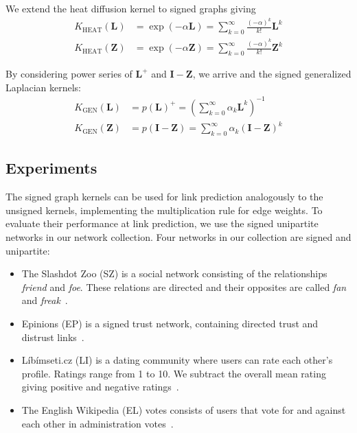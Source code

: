 \documentclass[11pt,a4paper]{book}
\begin{document}
We extend the heat diffusion kernel to signed graphs giving
\begin{align}
  K_{\mathrm{HEAT}}(\mathbf L)  &= \exp(-\alpha \mathbf
  L) 
  = \sum_{k=0}^\infty \frac {(-\alpha)^k} {k!} \mathbf L^k
  \label{eq:signed-heat-diffusion} 
  \\ 
  K_{\mathrm{HEAT}}(\mathbf Z) &= \exp(-\alpha \mathbf Z) 
  = \sum_{k=0}^\infty \frac {(-\alpha)^k} {k!} \mathbf Z^k
  \label{eq:signed-normalized-heat-diffusion}
\end{align}

By considering power series of $\mathbf L^+$ and $\mathbf I - \mathbf
Z$, we 
arrive and the signed generalized Laplacian kernels:
\begin{align}
  K_{\mathrm{GEN}}(\mathbf L) &= p(\mathbf L)^+ = \left(
  \sum_{k=0}^\infty \alpha_k \mathbf L^k \right)^{-1}
  \label{eq:signed-generalized-laplacian-kernel} \\ 
  K_{\mathrm{GEN}}(\mathbf Z) &= p(\mathbf I - \mathbf Z) =
  \sum_{k=0}^\infty \alpha_k (\mathbf I - \mathbf Z)^k 
  \label{eq:signed-generalized-normalized-laplacian-kernel} 
\end{align}

\subsection{Experiments}
The signed graph kernels can be used for link prediction analogously to
the unsigned kernels, implementing the multiplication rule for edge
weights.  To evaluate their performance at link prediction, we use the
signed unipartite networks in our network collection. 
Four networks in our collection are signed and unipartite:
\begin{itemize}
\item The Slashdot Zoo (\textsf{SZ}) is a social network consisting of the
  relationships \emph{friend} and \emph{foe}.  These relations are
  directed and their opposites are called \emph{fan} and
  \emph{freak}~\cite{kunegis:slashdot-zoo}.  
\item Epinions (\textsf{EP}) is a signed trust network, containing directed trust and
  distrust links~\cite{b367}. 
\item Líbímseti.cz (\textsf{LI}) is a dating community where users can rate each
  other's profile.  Ratings range from 1 to 10.  We subtract the
  overall mean rating giving positive and negative ratings~\cite{b311}. 
\item The English Wikipedia (\textsf{EL}) votes consists of users that vote for
  and against each other in administration votes~\cite{b551}. 
\end{itemize}
\end{document}
